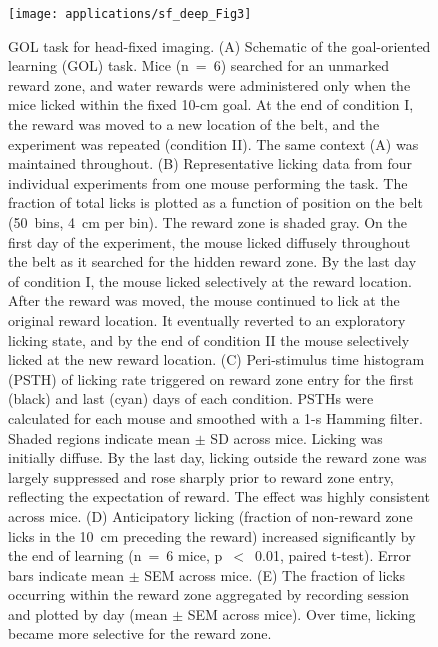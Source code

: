 \begin{figure}
	\centering
	\texttt{[image: applications/sf\_deep\_Fig3]}
	\caption[GOL task for head-fixed imaging]{GOL task for head-fixed imaging.
	(A) Schematic of the goal-oriented learning (GOL) task. Mice (n~=~6) searched for an unmarked reward zone, and water rewards were administered only when the mice licked within the fixed 10-cm goal. At the end of condition I, the reward was moved to a new location of the belt, and the experiment was repeated (condition II). The same context (A) was maintained throughout.
	(B) Representative licking data from four individual experiments from one mouse performing the task. The fraction of total licks is plotted as a function of position on the belt (50~bins, 4~cm per bin). The reward zone is shaded gray. On the first day of the experiment, the mouse licked diffusely throughout the belt as it searched for the hidden reward zone. By the last day of condition I, the mouse licked selectively at the reward location. After the reward was moved, the mouse continued to lick at the original reward location. It eventually reverted to an exploratory licking state, and by the end of condition II the mouse selectively licked at the new reward location.
	(C) Peri-stimulus time histogram (PSTH) of licking rate triggered on reward zone entry for the first (black) and last (cyan) days of each condition. PSTHs were calculated for each mouse and smoothed with a 1-s Hamming filter. Shaded regions indicate mean $\pm$ SD across mice. Licking was initially diffuse. By the last day, licking outside the reward zone was largely suppressed and rose sharply prior to reward zone entry, reflecting the expectation of reward. The effect was highly consistent across mice.
	(D) Anticipatory licking (fraction of non-reward zone licks in the 10~cm preceding the reward) increased significantly by the end of learning (n~=~6 mice, p~$<$~0.01, paired t-test). Error bars indicate mean $\pm$ SEM across mice.
	(E) The fraction of licks occurring within the reward zone aggregated by recording session and plotted by day (mean $\pm$ SEM across mice). Over time, licking became more selective for the reward zone.
	}
	\label{fig:other:sf-deep:GOL}
\end{figure}


